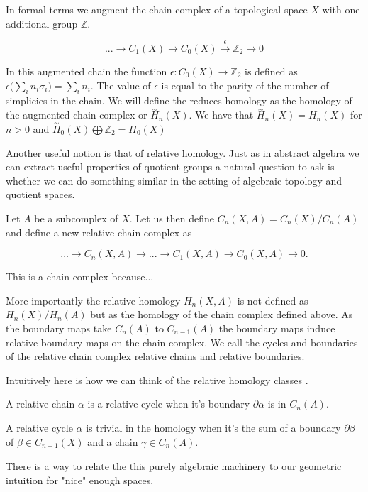 In formal terms we augment the chain complex of a topological space $X$ with one additional group $\mathbb{Z}$.

$$ ... \longrightarrow C_1(X) \longrightarrow C_0(X) \overset{\epsilon}{\longrightarrow} \mathbb{Z}_2 \longrightarrow 0 $$

In this augmented chain the function $\epsilon: C_0(X) \to \mathbb{Z}_2$ is defined as $\epsilon\big(\sum_{i}n_i\sigma_i\big) = \sum_{i}n_i$. The value of $\epsilon$ is equal to the parity of the number of simplicies in the chain. We will define the reduces homology as the homology of the augmented chain complex or $\overset{\sim}{H}_n(X)$. We have that $\overset{\sim}{H}_n(X) = H_n(X)$ for $n > 0$ and $\overset{\sim}{H}_0(X) \bigoplus \mathbb{Z}_2 = H_0(X) $

Another useful notion is that of relative homology. Just as in abstract algebra we can extract useful properties of quotient groups a natural question to ask is whether we can do something similar in the setting of algebraic topology and quotient spaces. 

Let $A$ be a subcomplex of $X$. Let us then define $C_n(X, A) = C_n(X) / C_n(A)$ and define a new relative chain complex as

$$ ... \longrightarrow C_n(X, A) \longrightarrow ... \longrightarrow C_1(X, A) \longrightarrow C_0(X, A) \longrightarrow 0. $$

This is a chain complex because...

More importantly the relative homology $H_n(X, A)$ is not defined as $H_n(X) / H_n(A)$ but as the homology of the chain complex defined above. As the boundary maps take $C_n(A)$ to $C_{n-1}(A)$ the boundary maps induce relative boundary maps on the chain complex. We call the cycles and boundaries of the relative chain complex relative chains and relative boundaries.

Intuitively here is how we can think of the relative homology classes \cite{algebraic-topology}.

A relative chain $\alpha$ is a relative cycle when it's boundary $\partial\alpha $ is in $C_n(A)$.

A relative cycle $\alpha$ is trivial in the homology when it's the sum of a boundary $\partial \beta$ of $\beta \in C_{n+1}(X)$ and a chain $\gamma \in C_n(A)$.

There is a way to relate the this purely algebraic machinery to our geometric intuition for "nice" enough spaces.




